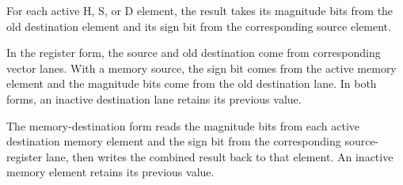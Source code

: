 For each active H, S, or D element, the result takes its magnitude bits from
the old destination element and its sign bit from the corresponding source
element.

In the register form, the source and old destination come from corresponding
vector lanes. With a memory source, the sign bit comes from the active memory
element and the magnitude bits come from the old destination lane. In both
forms, an inactive destination lane retains its previous value.

The memory-destination form reads the magnitude bits from each active
destination memory element and the sign bit from the corresponding
source-register lane, then writes the combined result back to that element. An
inactive memory element retains its previous value.
